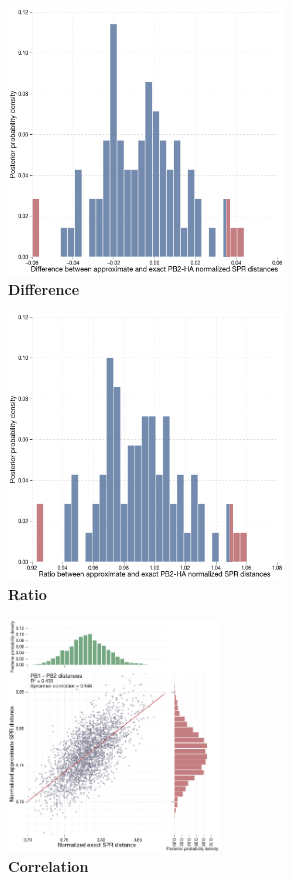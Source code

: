 \documentclass[11pt,oneside,letterpaper]{article}
\begin{document}
\begin{figure}
\centering  
\includegraphics[width=0.65\textwidth]  {supp_figures/InfB_supp_PB2-HA_hist.png}
\caption{\textbf{Difference}}
\label{}
\end{figure}

\begin{figure}
\centering  
\includegraphics[width=0.65\textwidth]  {supp_figures/InfB_supp_PB2-HA_hist2.png}
\caption{\textbf{Ratio}}
\label{}
\end{figure}

\begin{figure}
\centering  
\includegraphics[width=0.5\textwidth]  {supp_figures/InfB_supp_PB1-PB2_corr.png}
\caption{\textbf{Correlation}}
\label{}
\end{figure}
\end{document}
